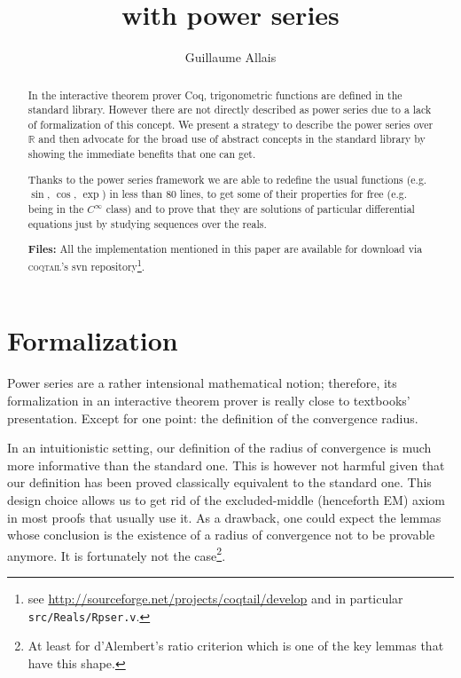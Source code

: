 \documentclass[submission,copyright]{eptcs}
\title{\coq{} with power series}
\author{Guillaume Allais
\institute{Junior Laboratory \coqtail{}\\
Ens Lyon - France\\}
\email{guillaume.allais@ens-lyon.org}}
\newcommand{\coq}{Coq}
\newcommand{\coqtail}{\textsc{coqtail}}
\newcommand{\R}{\mathbb{R}}
\begin{document}
\maketitle

\begin{abstract}
In the interactive theorem prover \coq{}\cite{coq}, trigonometric
functions are defined in the standard library. However there are not
directly described as power series  due to a lack of formalization of
this concept. We present a strategy to describe the power series over
$\R$ and then advocate for the broad use of abstract concepts in the
standard library by showing the immediate benefits that one can get.

Thanks to the power series framework we are able to redefine the usual
functions (e.g. $\sin$, $\cos$, $\exp$) in less than 80 lines,
to get some of their properties for free (e.g. being in the $C^{\infty}$
class) and to prove that they are solutions of particular differential
equations just by studying sequences over the reals.

\textbf{Files:} All the implementation mentioned in this paper are
available for download via \coqtail{}'s svn repository\footnote{see
\url{http://sourceforge.net/projects/coqtail/develop}
and in particular \texttt{src/Reals/Rpser.v}.}.

\end{abstract}

\section{Formalization}

Power series are a rather intensional mathematical notion; therefore, its 
formalization in an interactive theorem prover is really close to  
textbooks' presentation. Except for one point: the definition of the
convergence radius.

In an intuitionistic setting, our definition of the radius of convergence
is much more informative than the standard one.  This is however not
harmful given that our definition has been proved classically equivalent
to the standard one. This design choice allows us to get rid of the
excluded-middle (henceforth EM) axiom in most proofs that usually use
it. As a drawback, one could expect the lemmas whose conclusion is the
existence of a radius of convergence not to be provable anymore. It is
fortunately not the case\footnote{At least for d'Alembert's ratio criterion
which is one of the key lemmas that have this shape.}.
\end{document}
